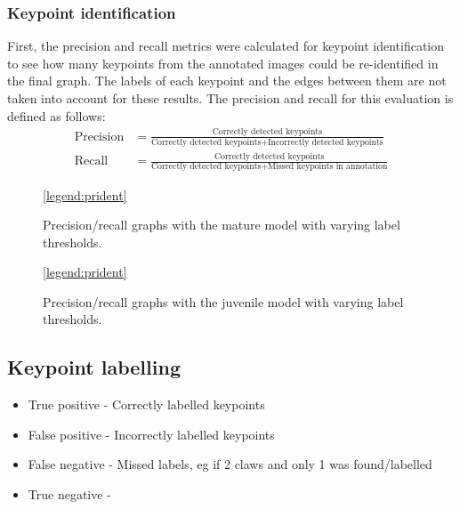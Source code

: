 \subsubsection{Keypoint identification}
First, the precision and recall metrics were calculated for keypoint identification to see how many keypoints from the annotated images could be re-identified in the final graph. The labels of each keypoint and the edges between them are not taken into account for these results. The precision and recall for this evaluation is defined as follows:
\begin{align}
\text{Precision} &= \frac{\text{Correctly detected keypoints}}{\text{Correctly detected keypoints} + \text{Incorrectly detected keypoints}} 
\\[10pt]
\text{Recall} &= \frac{\text{Correctly detected keypoints}}{\text{Correctly detected keypoints} + \text{Missed keypoints in annotation}}
\end{align}


\begin{figure}[H]
\centering
{}
\ref{legend:prident}
\caption{Precision/recall graphs with the mature model with varying label thresholds.}
\end{figure}

\begin{figure}[H]
\centering
{}
\ref{legend:prident}
\caption{Precision/recall graphs with the juvenile model with varying label thresholds.}
\end{figure}

\subsection{Keypoint labelling}


\begin{itemize}
\item True positive - Correctly labelled keypoints
\item False positive - Incorrectly labelled keypoints
\item False negative - Missed labels, eg if 2 claws and only 1 was found/labelled
\item True negative - 
\end{itemize}



